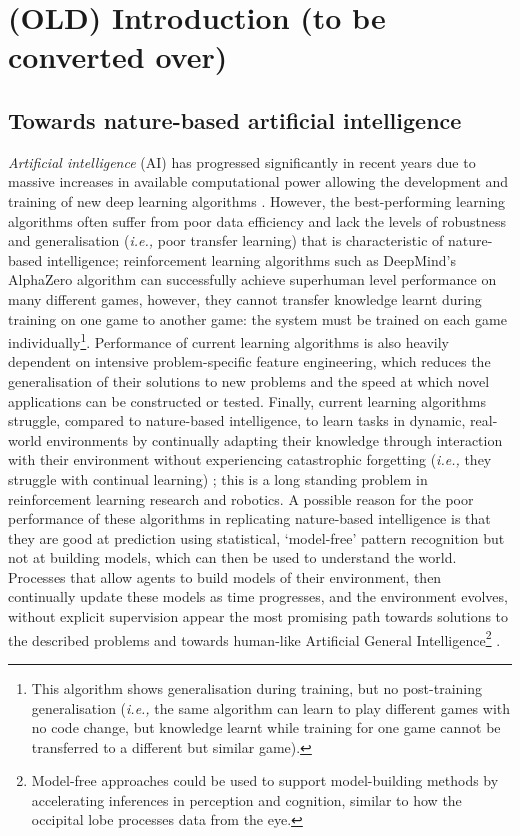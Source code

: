 \chapter{
(OLD) Introduction (to be converted over)
}\label{chp:Introduction}
\section{Towards nature-based artificial intelligence}

\textit{Artificial intelligence} (AI) has progressed significantly in recent years due to massive increases in available computational power allowing the development and training of new deep learning algorithms \autocite{amodei2018ai}.
However, the best-performing learning algorithms often suffer from poor data efficiency and lack the levels of robustness and generalisation (\textit{i.e.,} poor transfer learning) that is characteristic of nature-based intelligence; reinforcement learning algorithms such as DeepMind’s AlphaZero algorithm \autocite{Silver2017a, Silver2017b} can successfully achieve superhuman level performance on many different games, however, they cannot transfer knowledge learnt during training on one game to another game: the system must be trained on each game individually\footnote{This algorithm shows generalisation during training, but no post-training generalisation (\textit{i.e.,} the same algorithm can learn to play different games with no code change, but knowledge learnt while training for one game cannot be transferred to a different but similar game).}.
Performance of current learning algorithms is also heavily dependent on intensive problem-specific feature engineering, which reduces the generalisation of their solutions to new problems and the speed at which novel applications can be constructed or tested.
Finally, current learning algorithms struggle, compared to nature-based intelligence, to learn tasks in dynamic, real-world environments by continually adapting their knowledge through interaction with their environment without experiencing catastrophic forgetting (\textit{i.e.,} they struggle with continual learning) \autocite{Sauders2018}; this is a long standing problem in reinforcement learning research and robotics.
A possible reason for the poor performance of these algorithms in replicating nature-based intelligence is that they are good at prediction using statistical, ‘model-free’ pattern recognition but not at building models, which can then be used to understand the world.
Processes that allow agents to build models of their environment, then continually update these models as time progresses, and the environment evolves, without explicit supervision appear the most promising path towards solutions to the described problems and towards human-like Artificial General Intelligence\footnote{Model-free approaches could be used to support model-building methods by accelerating inferences in perception and cognition, similar to how the occipital lobe processes data from the eye.} \autocite{Lake2017, Bengio2013}.

